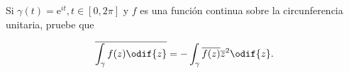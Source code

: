 \documentclass[../main.tex]{subfiles}
\begin{document}
\begin{problema}
    Si \(\gamma(t) = \mathrm{e}^{it}, t\in [0, 2\pi]\) y \( f\) es una función
    continua sobre la circunferencia unitaria, pruebe que

    \begin{equation*}
        \overline{\int_{\gamma}^{}f(z)\odif{z}} = -
        \int_{\gamma}^{}\overline{f(z)}\overline{z}^{2}\odif{z}.
    \end{equation*}
\end{problema}
\end{document}
